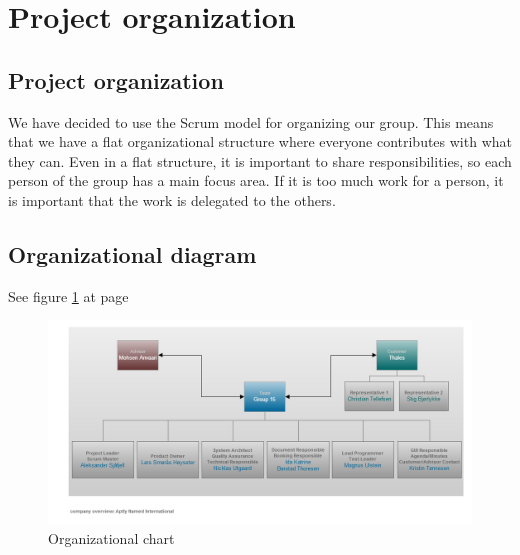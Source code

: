 

\section{Project organization}

\subsection{Project organization}
We have decided to use the Scrum model for organizing our group. This means that we have a flat organizational structure where everyone contributes with what they can. Even in a flat structure, it is important to share responsibilities, so each person of the group has a main focus area. If it is too much work for a person, it is important that the work is delegated to the others.

\subsection{Organizational diagram}
See figure \ref{fig:organizationalchart} at page \pageref{fig:organizationalchart}
\begin{figure}
\begin{center}
\includegraphics[width=\textwidth]{Organizational_Chart_v2}
\caption{Organizational chart} \label{fig:organizationalchart}
\end{center}
\end{figure}

